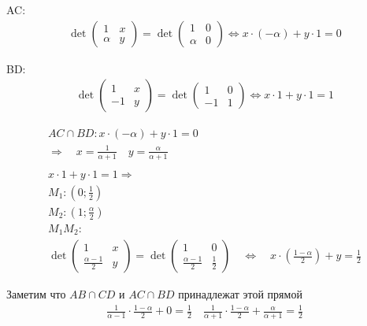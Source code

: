 		AC:
		\begin{gather*}
		\det 
			\begin{pmatrix}
				1 & x\\
				\alpha & y 
			\end{pmatrix} 
		= \det 
			\begin{pmatrix} 
				1 & 0\\
				\alpha & 0 
			\end{pmatrix}
		\Leftrightarrow x \cdot (-\alpha) + y \cdot 1 = 0
		\end{gather*}
		 
		BD: 
		\begin{gather*}
		\det 
			\begin{pmatrix} 
				1 & x\\ 
				-1 & y 
			\end{pmatrix} 
		= \det 
			 \begin{pmatrix} 
				 1 & 0\\
				 -1 & 1 
			 \end{pmatrix}
		 \Leftrightarrow x \cdot 1 + y \cdot 1 = 1
		 \end{gather*}
		 
		 \begin{gather*}
		 AC\cap BD: x \cdot (-\alpha) + y \cdot 1 = 0\\
		 \Rightarrow 
		 \quad x = \frac{1}{\alpha + 1} 
		 \quad y = \frac{\alpha}{\alpha + 1}\\
		\\
		 x \cdot 1 + y \cdot 1 = 1 \Rightarrow\\
		 	M_1: (0;\frac{1}{2})\\
		 	M_2: (1;\frac{\alpha}{2})\\
		 	M_1M_2:\\ 	
		 	\det \begin{pmatrix} 1 & x\\ \frac{\alpha-1}{2} & y \end{pmatrix} = 
		 	\det \begin{pmatrix} 1 & 0\\ \frac{\alpha-1}{2} & \frac{1}{2} \end{pmatrix} 
		 	\quad \Leftrightarrow 
		 	\quad x \cdot (\frac{1-\alpha}{2}) + y = \frac{1}{2} 
		 	\end{gather*}
		 	
		 Заметим что $AB\cap CD$ и $AC\cap BD$ принадлежат этой прямой 
		 \begin{gather*}
		 \frac{1}{\alpha - 1} \cdot \frac{1-\alpha}{2} + 0 = \frac{1}{2} \quad
		 \frac{1}{\alpha + 1} \cdot \frac{1-\alpha}{2} + \frac{\alpha}{\alpha + 1} = \frac{1}{2}
		 \end{gather*}
		
